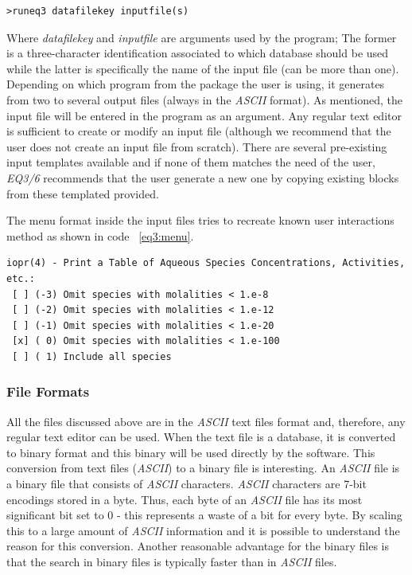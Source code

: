 \documentclass[ppgc,mestrado,english]{iiufrgs}
\begin{document}
\begin{lstlisting}[frame=single, caption=Running EQ3 in \emph{EQ3/6} package, label=eq3:run]
>runeq3 datafilekey inputfile(s)
\end{lstlisting}

Where \emph{datafilekey} and \emph{inputfile} are arguments used by the program; The former is a three-character identification associated to which database should be used while the latter is specifically the name of the input file (can be more than one). Depending on which program from the package the user is using, it generates from two to several output files (always in the \emph{ASCII} format).
As mentioned, the input file will be entered in the program as an argument. Any regular text editor is sufficient to create or modify an input file (although we recommend that the user does not create an input file from scratch). There are several pre-existing input templates available and if none of them matches the need of the user, \emph{EQ3/6} recommends that the user generate a new one by copying existing blocks from these templated provided.

The menu format inside the input files tries to recreate known user interactions method as shown in code ~\ref{eq3:menu}.

\begin{lstlisting}[frame=single, caption=Menu Option inside \emph{EQ3/6} input files that mimics a "radio button", label=eq3:menu]
iopr(4) - Print a Table of Aqueous Species Concentrations, Activities, etc.: 
 [ ] (-3) Omit species with molalities < 1.e-8 
 [ ] (-2) Omit species with molalities < 1.e-12 
 [ ] (-1) Omit species with molalities < 1.e-20 
 [x] ( 0) Omit species with molalities < 1.e-100 
 [ ] ( 1) Include all species 
\end{lstlisting}

\subsubsection{File Formats}

All the files discussed above are in the \emph{ASCII} text files format and, therefore, any regular text editor can be used. When the text file is a database, it is converted to binary format and this binary will be used directly by the software. This conversion from text files (\emph{ASCII}) to a binary file is interesting. An \emph{ASCII} file is a binary file that consists of \emph{ASCII} characters. \emph{ASCII} characters are 7-bit encodings stored in a byte. Thus, each byte of an \emph{ASCII} file has its most significant bit set to 0 - this represents a waste of a bit for every byte. By scaling this to a large amount of \emph{ASCII} information and it is possible to understand the reason for this conversion. Another reasonable advantage for the binary files is that the search in binary files is typically faster than in \emph{ASCII} files.
\end{document}
